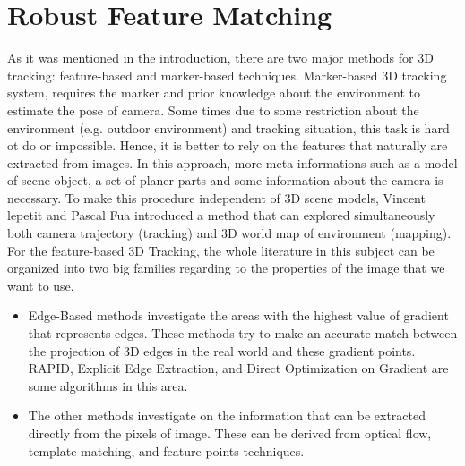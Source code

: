 \chapter{Robust Feature Matching}\label{chapter:Robust Feature Matching}
As it was mentioned in the introduction, there are two major methods for 3D tracking: feature-based and marker-based techniques. Marker-based 3D tracking system, requires the marker and prior knowledge about the environment to estimate the pose of camera. Some times due to some restriction about the environment (e.g. outdoor environment) and tracking situation, this task is hard ot do or impossible. Hence, it is better to rely on the features that naturally are extracted from images. In this approach, more meta informations such as a model of scene object, a set of planer parts and some information about the camera is necessary. To make this procedure independent of 3D scene models, Vincent lepetit and Pascal Fua \cite{lepetit2005monocular} introduced a method that can explored simultaneously both camera trajectory (tracking) and 3D world map of environment (mapping). \\
For the feature-based 3D Tracking, the whole literature in this subject can be organized into two big families regarding to the properties of the image that we want to use.
\begin{itemize}
\item Edge-Based methods investigate the areas with the highest value of gradient that represents edges. These methods try to make an accurate match between the projection of 3D edges in the real world and these gradient points. RAPID, Explicit Edge Extraction, and Direct Optimization on Gradient are some algorithms in this area. 
\item The other methods investigate on the information that can be extracted directly from the pixels of image. These can be derived from optical flow, template matching, and feature points techniques.
\end{itemize}

